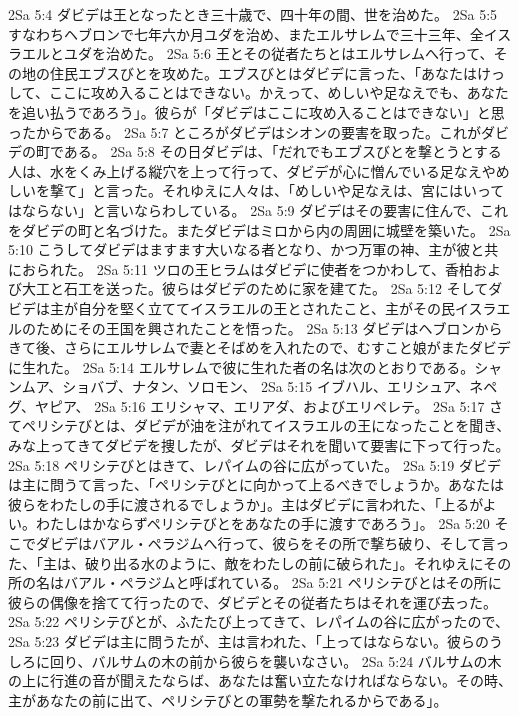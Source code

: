2Sa 5:4  ダビデは王となったとき三十歳で、四十年の間、世を治めた。
2Sa 5:5  すなわちヘブロンで七年六か月ユダを治め、またエルサレムで三十三年、全イスラエルとユダを治めた。
2Sa 5:6  王とその従者たちとはエルサレムへ行って、その地の住民エブスびとを攻めた。エブスびとはダビデに言った、「あなたはけっして、ここに攻め入ることはできない。かえって、めしいや足なえでも、あなたを追い払うであろう」。彼らが「ダビデはここに攻め入ることはできない」と思ったからである。
2Sa 5:7  ところがダビデはシオンの要害を取った。これがダビデの町である。
2Sa 5:8  その日ダビデは、「だれでもエブスびとを撃とうとする人は、水をくみ上げる縦穴を上って行って、ダビデが心に憎んでいる足なえやめしいを撃て」と言った。それゆえに人々は、「めしいや足なえは、宮にはいってはならない」と言いならわしている。
2Sa 5:9  ダビデはその要害に住んで、これをダビデの町と名づけた。またダビデはミロから内の周囲に城壁を築いた。
2Sa 5:10  こうしてダビデはますます大いなる者となり、かつ万軍の神、主が彼と共におられた。
2Sa 5:11  ツロの王ヒラムはダビデに使者をつかわして、香柏および大工と石工を送った。彼らはダビデのために家を建てた。
2Sa 5:12  そしてダビデは主が自分を堅く立ててイスラエルの王とされたこと、主がその民イスラエルのためにその王国を興されたことを悟った。
2Sa 5:13  ダビデはヘブロンからきて後、さらにエルサレムで妻とそばめを入れたので、むすこと娘がまたダビデに生れた。
2Sa 5:14  エルサレムで彼に生れた者の名は次のとおりである。シャンムア、ショバブ、ナタン、ソロモン、
2Sa 5:15  イブハル、エリシュア、ネペグ、ヤピア、
2Sa 5:16  エリシャマ、エリアダ、およびエリペレテ。
2Sa 5:17  さてペリシテびとは、ダビデが油を注がれてイスラエルの王になったことを聞き、みな上ってきてダビデを捜したが、ダビデはそれを聞いて要害に下って行った。
2Sa 5:18  ペリシテびとはきて、レパイムの谷に広がっていた。
2Sa 5:19  ダビデは主に問うて言った、「ペリシテびとに向かって上るべきでしょうか。あなたは彼らをわたしの手に渡されるでしょうか」。主はダビデに言われた、「上るがよい。わたしはかならずペリシテびとをあなたの手に渡すであろう」。
2Sa 5:20  そこでダビデはバアル・ペラジムへ行って、彼らをその所で撃ち破り、そして言った、「主は、破り出る水のように、敵をわたしの前に破られた」。それゆえにその所の名はバアル・ペラジムと呼ばれている。
2Sa 5:21  ペリシテびとはその所に彼らの偶像を捨てて行ったので、ダビデとその従者たちはそれを運び去った。
2Sa 5:22  ペリシテびとが、ふたたび上ってきて、レパイムの谷に広がったので、
2Sa 5:23  ダビデは主に問うたが、主は言われた、「上ってはならない。彼らのうしろに回り、バルサムの木の前から彼らを襲いなさい。
2Sa 5:24  バルサムの木の上に行進の音が聞えたならば、あなたは奮い立たなければならない。その時、主があなたの前に出て、ペリシテびとの軍勢を撃たれるからである」。
